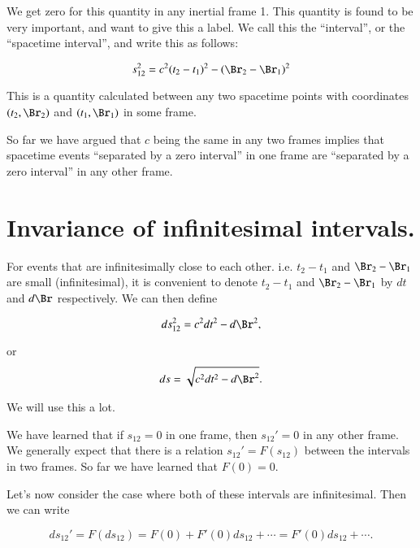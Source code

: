 We get zero for this quantity in any inertial frame 1.  This quantity is found to be very important, and want to give this a label.  We call this the ``interval'', or the ``spacetime interval'', and write this as follows:

\begin{equation}\label{eqn:relativisticElectrodynamicsL2:50}
s_{12}^2 = c^2 (t_2 - t_1)^2 - (\Br_2 - \Br_1)^2
\end{equation}

This is a quantity calculated between any two spacetime points with coordinates $(t_2, \Br_2)$ and $(t_1, \Br_1)$ in some frame.

So far we have argued that $c$ being the same in any two frames implies that spacetime events ``separated by a zero interval'' in one frame are ``separated by a zero interval'' in any other frame.

\section{Invariance of infinitesimal intervals.}

For events that are infinitesimally close to each other.  i.e. $t_2 - t_1$ and $\Br_2 -\Br_1$ are small (infinitesimal), it is convenient to denote $t_2 - t_1$ and $\Br_2 - \Br_1$ by $dt$ and $d\Br$ respectively.  We can then define

\begin{equation}\label{eqn:relativisticElectrodynamicsL2:60}
ds_{12}^2 = c^2 dt^2 - d\Br^2,
\end{equation}

or
\begin{equation}\label{eqn:relativisticElectrodynamicsL2:60b}
ds= \sqrt{c^2 dt^2 - d\Br^2}.
\end{equation}

We will use this a lot.

We have learned that if $s_{12} = 0$ in one frame, then $s_{12}' = 0$ in any other frame.  We generally expect that there is a relation $s_{12}' = F(s_12)$ between the intervals in two frames.  So far we have learned that $F(0) = 0$. 

Let's now consider the case where both of these intervals are infinitesimal.  Then we can write

\begin{equation}\label{eqn:relativisticElectrodynamicsL2:70}
ds_{12}' = F(ds_{12}) = F(0) + F'(0) ds_{12} + \cdots = F'(0) ds_{12} + \cdots.
\end{equation}


